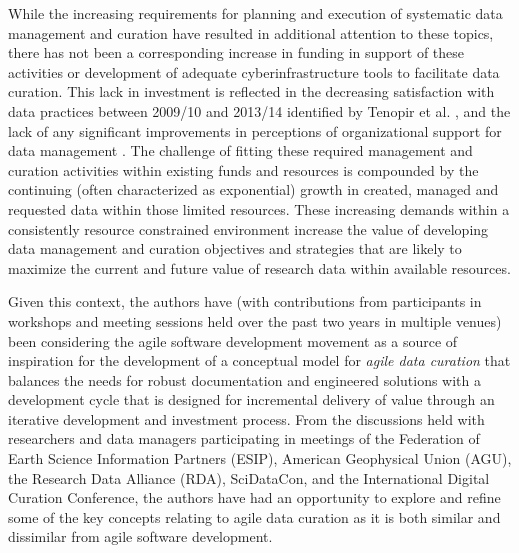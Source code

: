 \documentclass[paper]{ijdc-v9}
\begin{document}
While the increasing requirements for planning and execution of
systematic data management and curation have resulted in additional
attention to these topics, there has not been a corresponding increase
in funding in support of these activities or development of adequate
cyberinfrastructure tools to facilitate data curation. This lack in
investment is reflected in the decreasing satisfaction with data
practices between 2009/10 and 2013/14 identified by Tenopir et al.
\autocite*[Table M, supplemental materials]{tenopir_changes_2015}, and
the lack of any significant improvements in perceptions of
organizational support for data management \autocite[Table N,
supplemental materials]{tenopir_changes_2015}. The challenge of fitting
these required management and curation activities within existing funds
and resources is compounded by the continuing (often characterized as
exponential) growth
\autocites{turner_executive_2016}{national_aeronautics_and_space_administration_nasa_heasarc_2016}
in created, managed and requested data within those limited resources.
These increasing demands within a consistently resource constrained
environment increase the value of developing data management and
curation objectives and strategies that are likely to maximize the
current and future value of research data within available resources.

Given this context, the authors have (with contributions from
participants in workshops and meeting sessions held over the past two
years in multiple venues) been considering the agile software
development movement \autocite{beck_manifesto_2001} as a source of
inspiration for the development of a conceptual model for \emph{agile
data curation} that balances the needs for robust documentation and
engineered solutions with a development cycle that is designed for
incremental delivery of value through an iterative development and
investment process. From the discussions held with researchers and data
managers participating in meetings of the Federation of Earth Science
Information Partners (ESIP), American Geophysical Union (AGU), the
Research Data Alliance (RDA), SciDataCon, and the International Digital
Curation Conference, the authors have had an opportunity to explore and
refine some of the key concepts relating to agile data curation as it is
both similar and dissimilar from agile software development.
\end{document}
